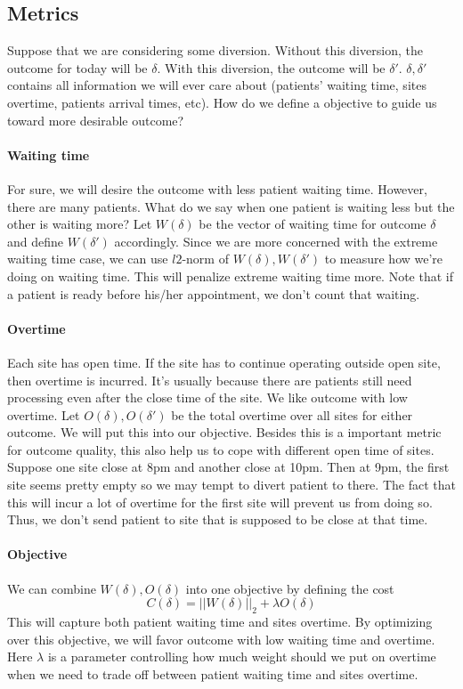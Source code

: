 \subsection{Metrics}

Suppose that we are considering some diversion. Without this diversion, the outcome for today will be $\delta$. With this diversion, the outcome will be $\delta'$. $\delta, \delta'$ contains all information we will ever care about (patients' waiting time, sites overtime, patients arrival times, etc). How do we define a objective to guide us toward more desirable outcome?

\paragraph{Waiting time} For sure, we will desire the outcome with less patient waiting time. However, there are many patients. What do we say when one patient is waiting less but the other is waiting more? Let $W(\delta)$ be the vector of waiting time for outcome $\delta$ and define $W(\delta')$ accordingly. Since we are more concerned with the extreme waiting time case, we can use $l2$-norm of $W(\delta), W(\delta')$ to measure how we're doing on waiting time. This will penalize extreme waiting time more. Note that if a patient is ready before his/her appointment, we don't count that waiting.

\paragraph{Overtime} Each site has open time. If the site has to continue operating outside open site, then overtime is incurred. It's usually because there are patients still need processing even after the close time of the site. We like outcome with low overtime. Let $O(\delta), O(\delta')$ be the total overtime over all sites for either outcome. We will put this into our objective. Besides this is a important metric for outcome quality, this also help us to cope with different open time of sites. Suppose one site close at 8pm and another close at 10pm. Then at 9pm, the first site seems pretty empty so we may tempt to divert patient to there. The fact that this will incur a lot of overtime for the first site will prevent us from doing so. Thus, we don't send patient to site that is supposed to be close at that time.

\paragraph{Objective} We can combine $W(\delta), O(\delta)$ into one objective by defining the cost
\[  C(\delta) = ||W(\delta)||_2 + \lambda O(\delta) \]
This will capture both patient waiting time and sites overtime. By optimizing over this objective, we will favor outcome with low waiting time and overtime. Here $\lambda$ is a parameter controlling how much weight should we put on overtime when we need to trade off between patient waiting time and sites overtime.

